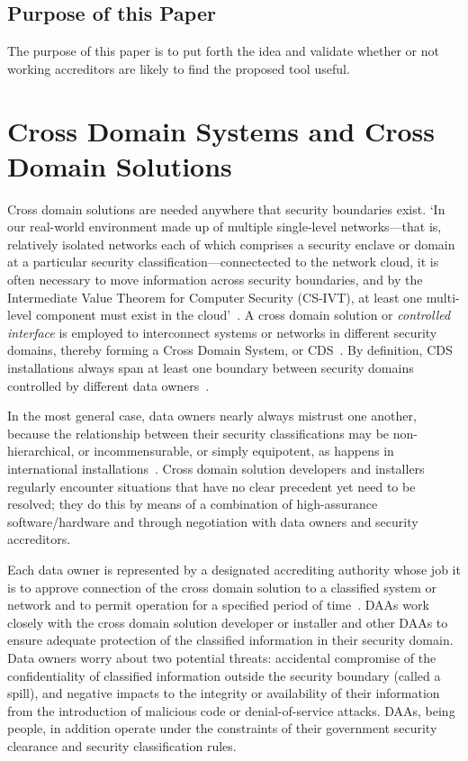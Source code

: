 \documentclass{llncs}
\begin{document}
\subsection{Purpose of this Paper}

The purpose of this paper
is to put forth the idea and validate whether or not working accreditors
are likely to find the proposed tool useful.

\section{Cross Domain Systems and Cross Domain Solutions}

Cross domain solutions are needed anywhere that security boundaries exist.
`In our real-world environment made up of multiple single-level networks---that is,
relatively isolated networks each of which comprises a security enclave or
domain at a particular security classification---connectected to the
network cloud, it is often necessary to move information across security
boundaries, and by the Intermediate Value Theorem for Computer Security (CS-IVT),
at least one multi-level component must exist in the
cloud'~\cite[]{Bell2005b,Loughry2012b}.  A cross domain solution or
\emph{controlled interface} is employed to interconnect systems or networks
in different security domains, thereby forming a Cross Domain System,
or CDS~\cite{DCID-6/3a}.
By definition, CDS installations always span at least one boundary between
security domains controlled by different data owners~\cite{Loughry2010a}.

In the most general case, data owners nearly always mistrust one another,
because the relationship between their security classifications may be
non-hierarchical, or incommensurable, or simply equipotent, as happens in
international
installations~\cite{TSOL_2.5_CMW}.  Cross domain solution developers and installers regularly
encounter situations that have no clear precedent yet need to be resolved;
they do this by means of a combination of high-assurance
software/hardware and through negotiation with data owners and security accreditors.

Each data owner is represented by a designated accrediting authority
whose job it is to approve connection of the cross domain solution to
a classified system or network and to permit operation for a specified period of
time~\cite{NIST-SP-800-37,NIST-SP-800-53A2,DIACAP,NIST-SP800-53r3}.
DAAs work closely with the cross domain solution developer or installer and other DAAs to ensure
adequate protection of the classified information in their security domain.
Data owners worry about two potential threats: accidental compromise of the confidentiality of
classified information outside the security boundary (called a spill),
and negative impacts to the integrity or availability of their information
from the introduction of malicious code or denial-of-service attacks.  DAAs,
being people, 
in addition operate under the constraints of their government security clearance and
security classification rules.
\end{document}
